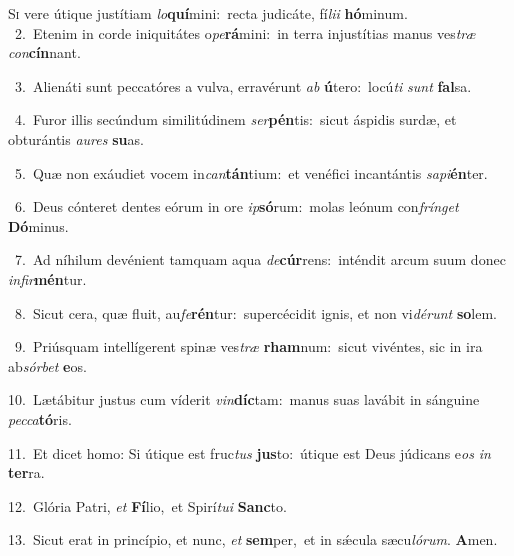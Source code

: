 \lettrine{\initial\textcolor{\initialcolor}{S}}{i} vere útique justítiam \textit{lo}\-\textbf{quí}mini:~\star recta judicáte, fí\-\textit{li}\-\textit{i} \textbf{hó}\-minum.\\
{\numbfont\textcolor{\numbcolor}{~2.}}~Etenim in corde iniquitátes o\-\textit{pe}\-\textbf{rá}mini:~\star in terra injustítias manus ves\textit{træ} \textit{con}\-\textbf{cín}nant.\par
{\numbfont\textcolor{\numbcolor}{~3.}}~Alienáti sunt peccatóres a vulva, erravérunt \textit{ab} \textbf{ú}\-tero:~\star locú\textit{ti} \textit{sunt} \textbf{fal}\-sa.\par
{\numbfont\textcolor{\numbcolor}{~4.}}~Furor illis secúndum similitúdinem \textit{ser}\-\textbf{pén}tis:~\star sicut áspidis surdæ, et obturántis \textit{au}\-\textit{res} \textbf{su}\-as.\par
{\numbfont\textcolor{\numbcolor}{~5.}}~Quæ non exáudiet vocem in\-\textit{can}\-\textbf{tán}tium:~\star et venéfici incantántis \textit{sa}\-\textit{pi}\textbf{én}ter.\par
{\numbfont\textcolor{\numbcolor}{~6.}}~Deus cónteret dentes eórum in ore \textit{ip}\-\textbf{só}rum:~\star molas leónum con\-\textit{frín}\-\textit{get} \textbf{Dó}\-minus.\par
{\numbfont\textcolor{\numbcolor}{~7.}}~Ad níhilum devénient tamquam aqua \textit{de}\-\textbf{cúr}rens:~\star inténdit arcum suum donec \textit{in}\-\textit{fir}\textbf{mén}tur.\par
{\numbfont\textcolor{\numbcolor}{~8.}}~Sicut cera, quæ fluit, au\-\textit{fe}\-\textbf{rén}tur:~\star supercécidit ignis, et non vi\-\textit{dé}\-\textit{runt} \textbf{so}\-lem.\par
{\numbfont\textcolor{\numbcolor}{~9.}}~Priúsquam intellígerent spinæ ves\textit{træ} \textbf{rham}\-num:~\star sicut vivéntes, sic in ira ab\-\textit{sór}\-\textit{bet} \textbf{e}\-os.\par
{\numbfont\textcolor{\numbcolor}{10.}}~Lætábitur justus cum víderit \textit{vin}\-\textbf{díc}tam:~\star manus suas lavábit in sánguine \textit{pec}\-\textit{ca}\textbf{tó}ris.\par
{\numbfont\textcolor{\numbcolor}{11.}}~Et dicet homo: Si útique est fruc\textit{tus} \textbf{jus}\-to:~\star útique est Deus júdicans e\textit{os} \textit{in} \textbf{ter}\-ra.\par
{\numbfont\textcolor{\numbcolor}{12.}}~Glória Patri, \textit{et} \textbf{Fí}\-lio,~\star et Spirí\-\textit{tu}\-\textit{i} \textbf{Sanc}\-to.\par
{\numbfont\textcolor{\numbcolor}{13.}}~Sicut erat in princípio, et nunc, \textit{et} \textbf{sem}\-per,~\star et in sǽcula sæcu\-\textit{ló}\-\textit{rum}. \textbf{A}\-men.\par
